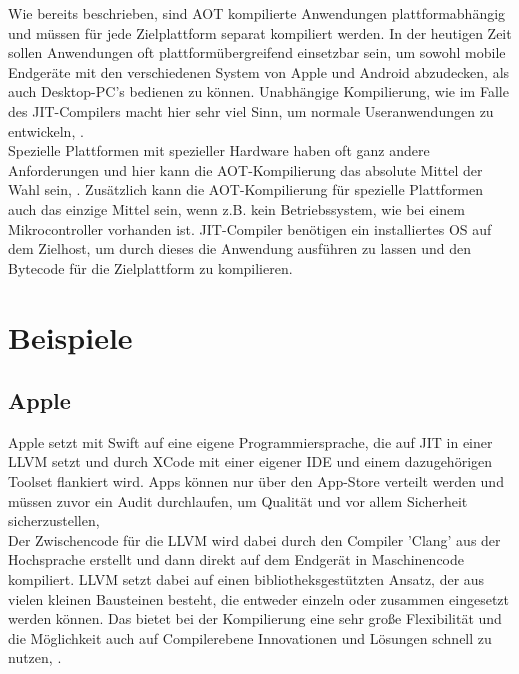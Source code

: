 Wie bereits beschrieben, sind \ac{AOT} kompilierte Anwendungen plattformabhängig und müssen für jede Zielplattform separat kompiliert werden. In der heutigen Zeit sollen Anwendungen oft plattformübergreifend einsetzbar sein, um sowohl mobile Endgeräte mit den verschiedenen System von Apple und Android abzudecken, als auch Desktop-PC's bedienen zu können. Unabhängige Kompilierung, wie im Falle des \ac{JIT}-Compilers macht hier sehr viel Sinn, um normale Useranwendungen zu entwickeln, \cite[vgl. Kotzmann Wimmer, 2008, S.18ff]{KotzmannWimmer2008}. \\
Spezielle Plattformen mit spezieller Hardware haben oft ganz andere Anforderungen und hier kann die \ac{AOT}-Kompilierung das absolute Mittel der Wahl sein, \cite[vgl. Louis 2016, S.1]{louis_2016}. Zusätzlich kann die \ac{AOT}-Kompilierung für spezielle Plattformen auch das einzige Mittel sein, wenn z.B. kein Betriebssystem, wie bei einem Mikrocontroller vorhanden ist. \ac{JIT}-Compiler benötigen ein installiertes \ac{OS} auf dem Zielhost, um durch dieses die Anwendung ausführen zu lassen und den Bytecode für die Zielplattform zu kompilieren. 

\section{Beispiele}
\subsection{Apple}
Apple setzt mit Swift auf eine eigene Programmiersprache, die auf \ac{JIT} in einer \ac{LLVM} setzt und durch XCode mit einer eigener \ac{IDE} und einem dazugehörigen Toolset flankiert wird. Apps können nur über den App-Store verteilt werden und müssen zuvor ein Audit durchlaufen, um Qualität und vor allem Sicherheit sicherzustellen, \cite[vgl. Apple Inc. 2022, Webseite abgerufen am 03.12.2022]{swift_compiler} \\
Der Zwischencode für die \ac{LLVM} wird dabei durch den Compiler 'Clang' aus der Hochsprache erstellt und dann direkt auf dem Endgerät in Maschinencode kompiliert. \ac{LLVM} setzt dabei auf einen bibliotheksgestützten Ansatz, der aus vielen kleinen Bausteinen besteht, die entweder einzeln oder zusammen eingesetzt werden können. Das bietet bei der Kompilierung eine sehr große Flexibilität und die Möglichkeit auch auf Compilerebene Innovationen und Lösungen schnell zu nutzen, \cite[vgl. Apple Inc. 2012, Webseite abgerufen am 03.12.2022]{llvm_overview_2012}. 

